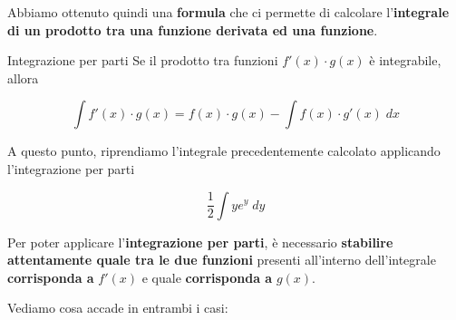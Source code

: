\documentclass[a4paper, 12pt]{report}
\begin{document}
    Abbiamo ottenuto quindi una \textbf{formula} che ci permette di calcolare l'\textbf{integrale di un prodotto tra una funzione derivata ed una funzione}.
    
    
    \begin{framedprop}{Integrazione per parti}
    Se il prodotto tra funzioni $f'(x) \cdot g(x)$ è integrabile, allora

    \[ \int f'(x) \cdot g(x) = f(x) \cdot g(x) - \int f(x) \cdot g'(x) \; dx\]
    \end{framedprop}
    A questo punto, riprendiamo l'integrale precedentemente calcolato applicando l'integrazione per parti
    
    \[ \frac{1}{2} \int y e^{y} \; dy\]
    
    Per poter applicare l'\textbf{integrazione per parti}, è necessario \textbf{stabilire attentamente quale tra le due funzioni} presenti all'interno dell'integrale \textbf{corrisponda a }$f'(x)$ e quale \textbf{corrisponda a} $g(x)$.
    
    Vediamo cosa accade in entrambi i casi:
    
\end{document}
